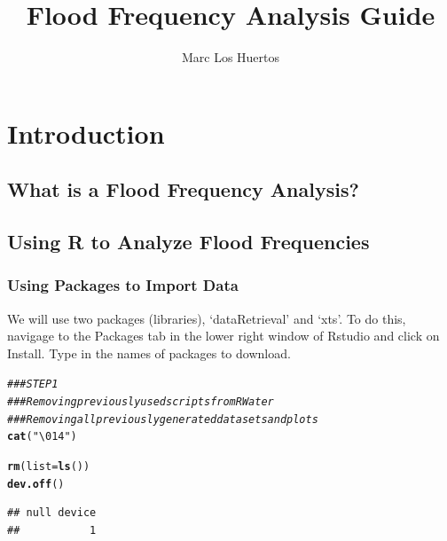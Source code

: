 \documentclass{article}\usepackage[]{graphicx}\usepackage[]{color}
\title{Flood Frequency Analysis Guide}
\author{Marc Los Huertos}
\makeatletter
\newcommand{\hlstr}[1]{\textcolor[rgb]{0.192,0.494,0.8}{#1}}%
\newcommand{\hlcom}[1]{\textcolor[rgb]{0.678,0.584,0.686}{\textit{#1}}}%
\newcommand{\hlstd}[1]{\textcolor[rgb]{0.345,0.345,0.345}{#1}}%
\newcommand{\hlkwc}[1]{\textcolor[rgb]{0.333,0.667,0.333}{#1}}%
\newcommand{\hlkwd}[1]{\textcolor[rgb]{0.737,0.353,0.396}{\textbf{#1}}}%
\newenvironment{kframe}{%
 \def\at@end@of@kframe{}%
 \ifinner\ifhmode%
  \def\at@end@of@kframe{\end{minipage}}%
  \begin{minipage}{\columnwidth}%
 \fi\fi%
 \def\FrameCommand##1{\hskip\@totalleftmargin \hskip-\fboxsep
 \colorbox{shadecolor}{##1}\hskip-\fboxsep
     \hskip-\linewidth \hskip-\@totalleftmargin \hskip\columnwidth}%
 \MakeFramed {\advance\hsize-\width
   \@totalleftmargin\z@ \linewidth\hsize
   \@setminipage}}%
 {\par\unskip\endMakeFramed%
 \at@end@of@kframe}
\newenvironment{knitrout}{}{} %
\makeatother
\begin{document}
\maketitle

\section{Introduction}

\subsection{What is a Flood Frequency Analysis?}

\subsection{Using R to Analyze Flood Frequencies}


\subsubsection{Using Packages to Import Data}

We will use two packages (libraries), `dataRetrieval' and `xts'. To do this, navigage to the Packages tab in the lower right window of Rstudio and click on Install. Type in the names of packages to download.  
\begin{knitrout}
\color{fgcolor}\begin{kframe}
\begin{alltt}
\hlcom{### STEP 1}
\hlcom{### Removing previously used scripts from RWater}
\hlcom{### Removing all previously generated datasets and plots }
\hlkwd{cat}\hlstd{(}\hlstr{"\textbackslash{}014"}\hlstd{)}
\end{alltt}
\end{kframe}\begin{kframe}\begin{alltt}
\hlkwd{rm}\hlstd{(}\hlkwc{list} \hlstd{=} \hlkwd{ls}\hlstd{())}
\hlkwd{dev.off}\hlstd{()}
\end{alltt}
\begin{verbatim}
## null device 
##           1
\end{verbatim}
\end{kframe}
\end{knitrout}
\end{document}

